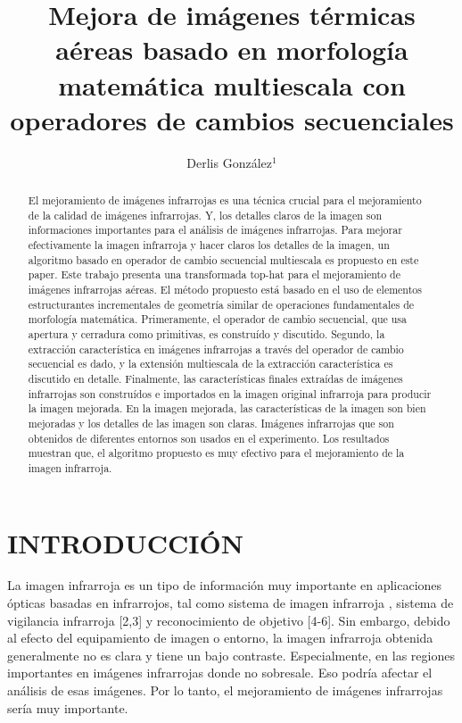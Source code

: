 \documentclass[a4paper, 11 pt, conference]{ieeeconf}      %
\title{\LARGE \bf
Mejora de im\'agenes t\'ermicas a\'ereas basado en morfolog\'ia matem\'atica multiescala con operadores de cambios secuenciales
}
\author{Derlis Gonz\'alez$^{1}$ %
}
\begin{document}
\maketitle
\thispagestyle{empty}
\pagestyle{empty}

\begin{abstract}

El mejoramiento de im\'agenes infrarrojas es una t\'ecnica crucial para el mejoramiento de la calidad de im\'agenes infrarrojas. Y, los detalles claros de la imagen son informaciones importantes para el an\'alisis de im\'agenes infrarrojas. Para mejorar efectivamente la imagen infrarroja y hacer claros los detalles de la imagen, un algoritmo basado en operador de cambio secuencial multiescala es propuesto en este paper. Este trabajo presenta una transformada top-hat para el mejoramiento de im\'agenes infrarrojas a\'ereas. El m\'etodo propuesto est\'a basado en el uso de elementos estructurantes incrementales de geometr\'ia similar de operaciones fundamentales de morfolog\'ia matem\'atica. Primeramente, el operador de cambio secuencial, que usa apertura y cerradura como primitivas, es constru\'ido y discutido. Segundo, la extracci\'on caracter\'istica en im\'agenes infrarrojas a trav\'es del operador de cambio secuencial es dado, y la extensi\'on multiescala de la extracci\'on caracter\'istica es discutido en detalle. Finalmente, las caracter\'isticas finales extra\'idas de im\'agenes infrarrojas son constru\'idos e importados en la imagen original infrarroja para producir la imagen mejorada. En la imagen mejorada, las caracter\'isticas de la imagen son bien mejoradas y los detalles de las imagen son claras. Im\'agenes infrarrojas que son obtenidos de diferentes entornos son usados en el experimento. Los resultados muestran que, el algoritmo propuesto es muy efectivo para el mejoramiento de la imagen infrarroja.

\end{abstract}


\section{INTRODUCCI\'ON}

La imagen infrarroja es un tipo de información muy importante en aplicaciones ópticas basadas en infrarrojos, tal como sistema de imagen infrarroja \cite{c1}, sistema de vigilancia infrarroja [2,3] y reconocimiento de objetivo \cite{c4,c6} [4-6]. Sin embargo, debido al efecto del equipamiento de imagen o entorno, la imagen infrarroja obtenida generalmente no es clara y tiene un bajo contraste. Especialmente, en las regiones importantes en im\'agenes infrarrojas donde no sobresale. Eso podr\'ia afectar el an\'alisis de esas im\'agenes. Por lo tanto, el mejoramiento de im\'agenes infrarrojas ser\'ia muy importante.
\end{document}
